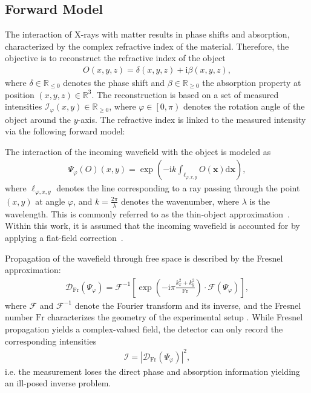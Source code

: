 \documentclass{article}
\def\x{{\mathbf x}}
\begin{document}
\subsection{Forward Model}
The interaction of X-rays with matter results in phase shifts and absorption, characterized by the complex refractive index of the material.
Therefore, the objective is to reconstruct the refractive index of the object  
\begin{align}
	O \left( x,y,z \right) = \delta \left( x,y,z \right) + \mathrm{i} \beta \left( x,y,z \right),
	\label{eq:refractive-index}
\end{align}
where $\delta \in \mathbb{R}_{\leq 0}$ denotes the phase shift and $\beta \in \mathbb{R}_{\geq 0}$ the absorption property at position $\left( x,y,z \right) \in \mathbb{R}^{3}$.  
The reconstruction is based on a set of measured intensities $\mathcal{I}_\varphi \left( x,y \right) \in \mathbb{R}_{\geq 0}$, where $\varphi \in \left[ 0, \pi \right)$ denotes the rotation angle of the object around the $y$-axis.  
The refractive index is linked to the measured intensity via the following forward model:

The interaction of the incoming wavefield with the object is modeled as
\begin{align}
	\Psi_{ \varphi} \left( O \right) \left( x,y \right) =
	\exp \left( - \mathrm{i}k  \int_{\ell_{\varphi, x, y}} O \left( \x \right) \mathrm{d}\x \right),
\end{align}
where $\ell_{\varphi, x, y}$ denotes the line corresponding to a ray passing through the point $\left( x,y \right)$ at angle $\varphi$, and $k=\frac{2\pi}{\lambda}$ denotes the wavenumber, where $\lambda$ is the wavelength.
This is commonly referred to as the thin-object approximation~\cite{paganinCoherentXrayOptics2006a}.  
Within this work, it is assumed that the incoming wavefield is accounted for by applying a flat-field correction~\cite{doraArtifactsuppressingReconstructionStrongly2024}.

Propagation of the wavefield through free space is described by the Fresnel approximation:  
\begin{align}
	\mathcal{D}_{\text{Fr}} \left( \Psi_{ \varphi} \right) = 
	\mathcal{F}^{-1} \left[ 
		\exp \left( - \mathrm{i} \pi \frac{k_{x}^{2} + k_{y}^{2}}{\text{Fr}} \right) 
		\cdot \mathcal{F} \left( \Psi_{ \varphi} \right)
	\right],
	\label{eq:fresnel}
\end{align}
where $\mathcal{F}$ and $\mathcal{F}^{-1}$ denote the Fourier transform and its inverse, and the Fresnel number $\text{Fr}$ characterizes the geometry of the experimental setup \cite{paganinCoherentXrayOptics2006a}.
While Fresnel propagation yields a complex-valued field, the detector can only record the corresponding intensities
\begin{align}
	\mathcal{I} = \left| \mathcal{D}_{\text{Fr}} \left( \Psi_{ \varphi} \right) \right|^{2},
\end{align}
i.e. the measurement loses the direct phase and absorption information yielding an ill-posed inverse problem.
\end{document}
